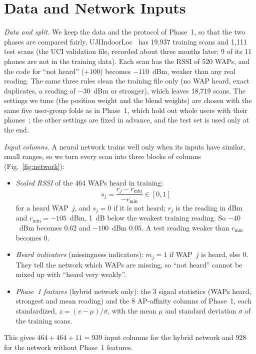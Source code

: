 \section{Data and Network Inputs}\label{sec:inputs}

\emph{Data and split.} We keep the data and the protocol of Phase~1, so that
the two phases are compared fairly. UJIIndoorLoc~\cite{torres2014ujiindoorloc}
has 19,937 training scans and 1,111 test scans (the UCI validation file,
recorded about three months later; 9 of its 11 phones are not in the training
data). Each scan has the RSSI of 520 WAPs, and the code for ``not heard''
($+100$) becomes $-110$~dBm, weaker than any real reading. The same three rules
clean the training file only (no WAP heard, exact duplicates, a reading of
$-30$~dBm or stronger), which leaves 18,719 scans. The settings we tune (the
position weight and the blend weights) are chosen with the same five user-group
folds as in Phase~1, which hold out whole users with their
phones~\cite{roberts2017crossvalidation}; the other settings are fixed in
advance, and the test set is used only at the end.

\emph{Input columns.} A neural network trains well only when its inputs have
similar, small ranges, so we turn every scan into three blocks of columns
(Fig.~\ref{fig:network}):
\begin{itemize}
\item \emph{Scaled RSSI} of the 464 WAPs heard in training:
  \begin{equation}
    s_j=\frac{r_j-r_{\min}}{-r_{\min}}\in[0,1]
    \label{eq:scale}
  \end{equation}
  for a heard WAP~$j$, and $s_j=0$ if it is not heard; $r_j$ is the reading in
  dBm and $r_{\min}=-105$~dBm, 1~dB below the weakest training reading. So $-40$~dBm becomes 0.62 and $-100$~dBm 0.05. A
  test reading weaker than $r_{\min}$ becomes 0.
\item \emph{Heard indicators} (missingness indicators): $m_j=1$ if WAP~$j$ is
  heard, else 0. They tell the network which WAPs are missing, so ``not
  heard'' cannot be mixed up with ``heard very weakly''.
\item \emph{Phase~1 features} (hybrid network only): the 3 signal statistics
  (WAPs heard, strongest and mean reading) and the 8 AP-affinity columns of
  Phase~1, each standardized, $z=(v-\mu)/\sigma$, with the mean $\mu$ and
  standard deviation $\sigma$ of the training scans.
\end{itemize}
This gives $464+464+11=939$ input columns for the hybrid network and 928 for
the network without Phase~1 features.

